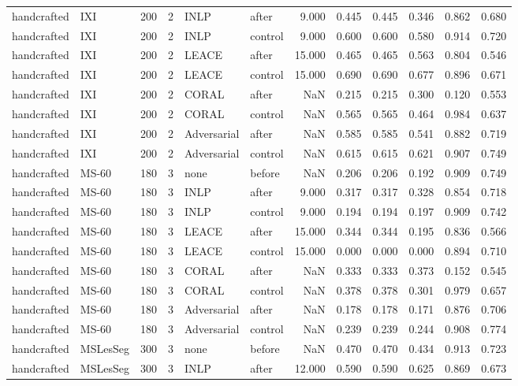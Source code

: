\begin{tabular}{llrrllrrrrrr}
handcrafted & IXI & 200 & 2 & INLP & after & 9.000 & 0.445 & 0.445 & 0.346 & 0.862 & 0.680 \\
handcrafted & IXI & 200 & 2 & INLP & control & 9.000 & 0.600 & 0.600 & 0.580 & 0.914 & 0.720 \\
handcrafted & IXI & 200 & 2 & LEACE & after & 15.000 & 0.465 & 0.465 & 0.563 & 0.804 & 0.546 \\
handcrafted & IXI & 200 & 2 & LEACE & control & 15.000 & 0.690 & 0.690 & 0.677 & 0.896 & 0.671 \\
handcrafted & IXI & 200 & 2 & CORAL & after & NaN & 0.215 & 0.215 & 0.300 & 0.120 & 0.553 \\
handcrafted & IXI & 200 & 2 & CORAL & control & NaN & 0.565 & 0.565 & 0.464 & 0.984 & 0.637 \\
handcrafted & IXI & 200 & 2 & Adversarial & after & NaN & 0.585 & 0.585 & 0.541 & 0.882 & 0.719 \\
handcrafted & IXI & 200 & 2 & Adversarial & control & NaN & 0.615 & 0.615 & 0.621 & 0.907 & 0.749 \\
handcrafted & MS-60 & 180 & 3 & none & before & NaN & 0.206 & 0.206 & 0.192 & 0.909 & 0.749 \\
handcrafted & MS-60 & 180 & 3 & INLP & after & 9.000 & 0.317 & 0.317 & 0.328 & 0.854 & 0.718 \\
handcrafted & MS-60 & 180 & 3 & INLP & control & 9.000 & 0.194 & 0.194 & 0.197 & 0.909 & 0.742 \\
handcrafted & MS-60 & 180 & 3 & LEACE & after & 15.000 & 0.344 & 0.344 & 0.195 & 0.836 & 0.566 \\
handcrafted & MS-60 & 180 & 3 & LEACE & control & 15.000 & 0.000 & 0.000 & 0.000 & 0.894 & 0.710 \\
handcrafted & MS-60 & 180 & 3 & CORAL & after & NaN & 0.333 & 0.333 & 0.373 & 0.152 & 0.545 \\
handcrafted & MS-60 & 180 & 3 & CORAL & control & NaN & 0.378 & 0.378 & 0.301 & 0.979 & 0.657 \\
handcrafted & MS-60 & 180 & 3 & Adversarial & after & NaN & 0.178 & 0.178 & 0.171 & 0.876 & 0.706 \\
handcrafted & MS-60 & 180 & 3 & Adversarial & control & NaN & 0.239 & 0.239 & 0.244 & 0.908 & 0.774 \\
handcrafted & MSLesSeg & 300 & 3 & none & before & NaN & 0.470 & 0.470 & 0.434 & 0.913 & 0.723 \\
handcrafted & MSLesSeg & 300 & 3 & INLP & after & 12.000 & 0.590 & 0.590 & 0.625 & 0.869 & 0.673 \\

\end{tabular}
